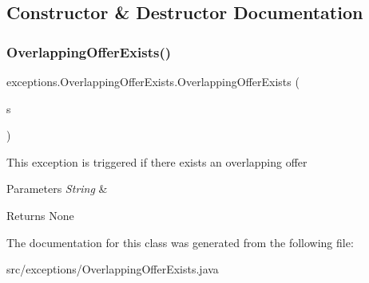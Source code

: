 \subsection{Constructor \& Destructor Documentation}
\mbox{\label{classexceptions_1_1_overlapping_offer_exists_a053baab9b6c9e1da073098c4cfbcdc45}} 
\subsubsection{\texorpdfstring{OverlappingOfferExists()}{OverlappingOfferExists()}}
{\footnotesize\ttfamily exceptions.\+Overlapping\+Offer\+Exists.\+Overlapping\+Offer\+Exists (\begin{DoxyParamCaption}\item[{String}]{s }\end{DoxyParamCaption})}

This exception is triggered if there exists an overlapping offer 
\begin{DoxyParams}{Parameters}
{\em String} & \\
\hline
\end{DoxyParams}
\begin{DoxyReturn}{Returns}
None 
\end{DoxyReturn}


The documentation for this class was generated from the following file\+:\begin{DoxyCompactItemize}
\item 
src/exceptions/Overlapping\+Offer\+Exists.\+java\end{DoxyCompactItemize}

